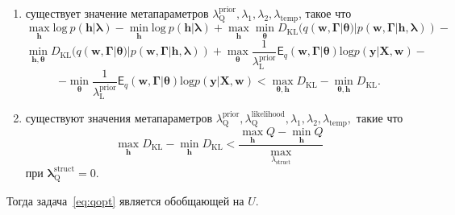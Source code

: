 \begin{theorem}
\begin{enumerate}[label={\arabic*)}]
\item существует значение метапараметров $ \lambda^\text{prior}_\text{Q}, \lambda_1, \lambda_2, \lambda_\text{temp}$, такое что 
\[
    \max_{\mathbf{h}} \text{log}~p (\mathbf{h}|\boldsymbol{\lambda}) - \min_{\mathbf{h}} \text{log}~p (\mathbf{h}|\boldsymbol{\lambda})  + \max_{\mathbf{h}} \min_{\boldsymbol{\theta}} D_\text{KL}(q(\mathbf{w}, \boldsymbol{\Gamma}|\boldsymbol{\theta})|p(\mathbf{w}, \boldsymbol{\Gamma}|\mathbf{h}, \boldsymbol{\lambda})) -
\]
\[ \min_{\mathbf{h}, \boldsymbol{\theta}} D_\text{KL}(q(\mathbf{w}, \boldsymbol{\Gamma}|\boldsymbol{\theta})|p(\mathbf{w}, \boldsymbol{\Gamma}|\mathbf{h}, \boldsymbol{\lambda})) + \max_{\boldsymbol{\theta}}\frac{1}{\lambda^\text{prior}_\text{L}}\mathsf{E}_q(\mathbf{w}, \boldsymbol{\Gamma}|\boldsymbol{\theta}) \text{log} p(\mathbf{y}|\mathbf{X}, \mathbf{w})  - 
\]
\[
 - \min_{\boldsymbol{\theta}}\frac{1}{\lambda^\text{prior}_\text{L}}\mathsf{E}_q(\mathbf{w}, \boldsymbol{\Gamma}|\boldsymbol{\theta}) \text{log} p(\mathbf{y}|\mathbf{X}, \mathbf{w}) < \max_{\boldsymbol{\theta}, \mathbf{h}} D_{\text{KL}} - \min_{\boldsymbol{\theta}, \mathbf{h}} D_{\text{KL}}.
\]

\item существуют значения метапараметров $\lambda^\text{prior}_\text{Q},\lambda^\text{likelihood}_\text{Q}, \lambda_1, \lambda_2, \lambda_\text{temp},$ такие что 
\[
\max_{\mathbf{h}} D_{\text{KL}} - \min_{\mathbf{h}} D_{\text{KL}} < \frac{\max_{\mathbf{h}} Q - \min_{\mathbf{h}} Q }{\max_{\lambda_\text{struct}}} 
\]
при $\boldsymbol{\lambda}^\text{struct}_\text{Q} = 0.$

\end{enumerate}
Тогда задача~\eqref{eq:qopt} является обобщающей на $U$.
\end{theorem}
